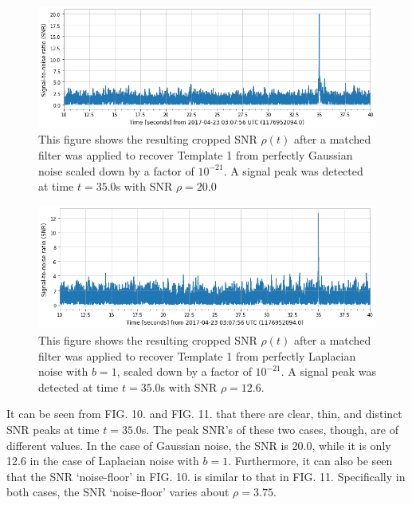 \documentclass[preprint,
letterpaper,
 amsmath,amssymb,
 aps,
]{revtex4-2}
\begin{document}
\begin{figure}[t]
\caption{This figure shows the resulting cropped SNR $\rho(t)$ after a matched filter was applied to recover Template 1 from perfectly Gaussian noise scaled down by a factor of $10^{-21}$. A signal peak was detected at time $t = 35.0$s with SNR $\rho = 20.0$}
\includegraphics[scale = .33]{gaussian -21 template 1.png}
\centering
\end{figure} 

\begin{figure}[h!]
\caption{This figure shows the resulting cropped SNR $\rho(t)$ after a matched filter was applied to recover Template 1 from perfectly Laplacian noise with $b=1$, scaled down by a factor of $10^{-21}$. A signal peak was detected at time $t = 35.0$s with SNR $\rho = 12.6$.}
\includegraphics[scale = .33]{laplacian b=1 template 1.png}
\centering
\end{figure} 
It can be seen from FIG. 10. and FIG. 11. that there are clear, thin, and distinct SNR peaks at time $t = 35.0$s. The peak SNR's of these two cases, though, are of different values. In the case of Gaussian noise, the SNR is 20.0, while it is only 12.6 in the case of Laplacian noise with $b=1$. Furthermore, it can also be seen that the SNR `noise-floor' in FIG. 10. is similar to that in FIG. 11. Specifically in both cases, the SNR `noise-floor' varies about $\rho = 3.75$. 
\end{document}
